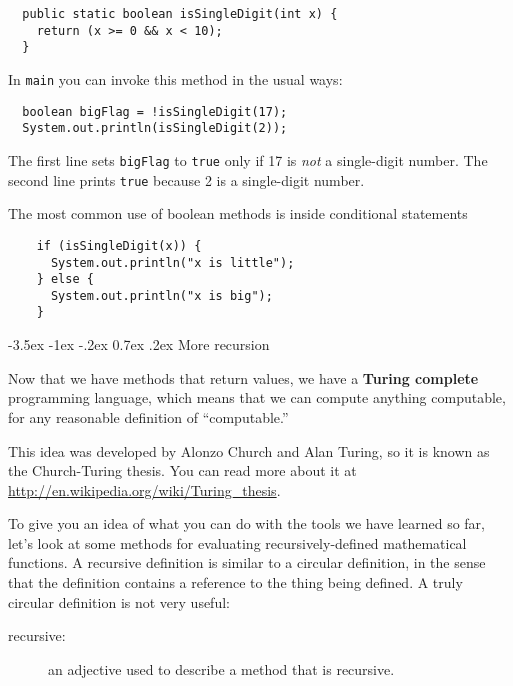 \documentclass{book}
\makeatletter
\renewcommand{\section}{\@startsection 
    {section} {1} {0mm}%
    {-3.5ex \@plus -1ex \@minus -.2ex}%
    {0.7ex \@plus.2ex}%
    {\normalfont\Large\bfseries}}
\makeatother
\begin{document}
\begin{verbatim}
  public static boolean isSingleDigit(int x) {
    return (x >= 0 && x < 10);
  }
\end{verbatim}
%
In {\tt main} you can invoke this method in the usual ways:

\begin{verbatim}
  boolean bigFlag = !isSingleDigit(17);
  System.out.println(isSingleDigit(2));
\end{verbatim}
%
The first line sets {\tt bigFlag} to {\tt true}
only if 17 is {\em not} a single-digit number.  The second
line prints {\tt true} because 2 is a single-digit number.

The most common use of boolean methods is inside conditional
statements

\begin{verbatim}
    if (isSingleDigit(x)) {
      System.out.println("x is little");
    } else {
      System.out.println("x is big");
    }
\end{verbatim}


\section {More recursion}

Now that we have methods that return values, we have a {\bf Turing
  complete} programming language, which means that we can compute
anything computable, for any reasonable definition of ``computable.''

This idea was developed by Alonzo Church and Alan Turing, so it is
known as the Church-Turing thesis.  You can read more about it at
\url{http://en.wikipedia.org/wiki/Turing_thesis}.

To give you an idea of what you can do with the tools we have learned
so far, let's look at some methods for evaluating
recursively-defined mathematical functions.  A recursive definition is
similar to a circular definition, in the sense that the definition
contains a reference to the thing being defined.  A truly circular
definition is not very useful:

\begin{description}

\item[recursive:] an adjective used to describe a method that is recursive.


\end{description}
\end{document}
